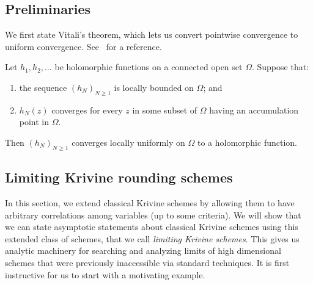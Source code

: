 \subsection{Preliminaries}

We first state Vitali's theorem, which lets us convert pointwise convergence to uniform convergence. See~\cite{schiff1993normal} for a reference. 

\begin{fact}
Let \(h_1,h_2,\ldots\) be holomorphic functions on a connected open set
\(\Omega\). Suppose that:
\begin{enumerate}
    \item the sequence \((h_N)_{N\geq 1}\) is locally bounded on \(\Omega\); and
    \item \(h_N(z)\) converges for every \(z\) in some subset of \(\Omega\)
    having an accumulation point in \(\Omega\).
\end{enumerate}
Then \((h_N)_{N\geq 1}\) converges locally uniformly on \(\Omega\) to a
holomorphic function.
\end{fact}


\subsection{Limiting Krivine rounding schemes}
\label{sec:LimitingKrivine}

In this section, we extend classical Krivine schemes by allowing them to have arbitrary correlations among variables (up to some criteria). We will show that we can state asymptotic statements about classical Krivine schemes using this extended class of schemes, that we call \textit{limiting Krivine schemes}. This gives us analytic machinery for searching and analyzing limits of high dimensional schemes that were previously inaccessible via standard techniques. It is first instructive for us to start with a motivating example. 

